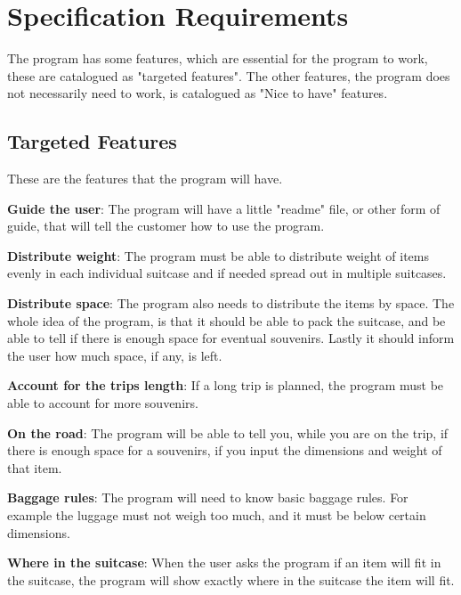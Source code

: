 \section{Specification Requirements}
\label{sec:Spec}
The program has some features, which are essential for the program to work, these are catalogued as "targeted features". The other features, the program does not necessarily need to work, is catalogued as "Nice to have" features.
\newline

\subsection{Targeted Features}
These are the features that the program will have. 

\textbf{Guide the user}:
The program will have a little "readme" file, or other form of guide, that will tell the customer how to use the program.
\newline

\textbf{Distribute weight}:
The program must be able to distribute weight of items evenly in each individual suitcase and if needed spread out in multiple suitcases.
\newline

\textbf{Distribute space}:
The program also needs to distribute the items by space. The whole idea of the program, is that it should be able to pack the suitcase, and be able to tell if there is enough space for eventual souvenirs. Lastly it should inform the user how much space, if any, is left.
\newline

\textbf{Account for the trips length}:
If a long trip is planned, the program must be able to account for more souvenirs.
\newline

\textbf{On the road}:
The program will be able to tell you, while you are on the trip, if there is enough space for a souvenirs, if you input the dimensions and weight of that item.
\newline

\textbf{Baggage rules}:
The program will need to know basic baggage rules. For example the luggage must not weigh too much, and it must be below certain dimensions.
\newline

\textbf{Where in the suitcase}:
When the user asks the program if an item will fit in the suitcase, the program will show exactly where in the suitcase the item will fit.
\newline

